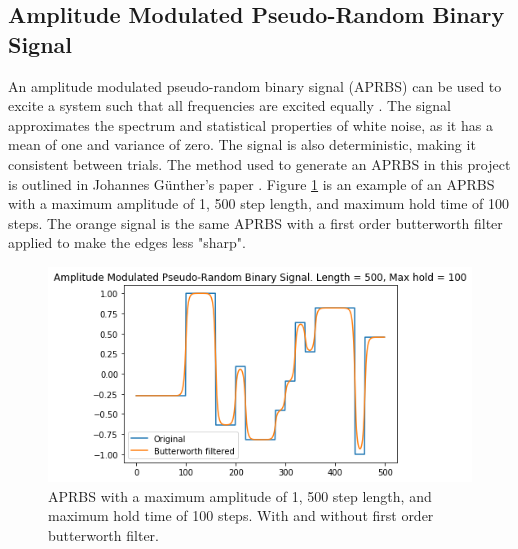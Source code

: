 \documentclass[letterpaper,12pt]{article}
\begin{document}
\subsection{Amplitude Modulated Pseudo-Random Binary Signal}
An amplitude modulated pseudo-random binary signal (APRBS) can be used to excite a system such that all frequencies are excited equally \cite{o.nelles}. The signal approximates the spectrum and statistical properties of	white noise, as it has a mean of one and variance of zero. The signal is also deterministic, making it consistent between trials. The method used to generate an APRBS in this project is outlined in Johannes Günther's paper \cite{j.gunther}. Figure \ref{fig:aprbs} is an example of an APRBS with a maximum amplitude of 1, 500 step length, and maximum hold time of 100 steps. The orange signal is the same APRBS with a first order butterworth filter applied to make the edges less "sharp".

\begin{figure}[H]
\centering \includegraphics[width=0.8\columnwidth]{aprbs.png}
\caption{\label{fig:aprbs}APRBS with a maximum amplitude of 1, 500 step length, and maximum hold time of 100 steps. With and without first order butterworth filter.}
\end{figure}
\end{document}
